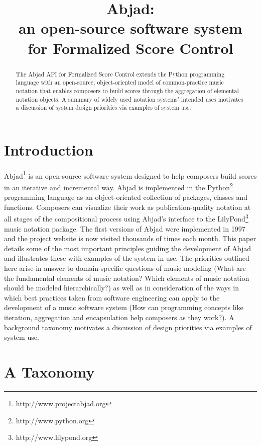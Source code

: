 \documentclass{article}
\title{Abjad: \\
an open-source software system \\
for Formalized Score Control}
\begin{document}
\capstartfalse
\maketitle
\capstarttrue

\begin{abstract}
The Abjad API for Formalized Score Control extends the Python programming
language with an open-source, object-oriented model of common-practice music
notation that enables composers to build scores through the aggregation of
elemental notation objects. A summary of widely used notation systems' intended
uses motivates a discussion of system design priorities via examples of system
use.
\end{abstract}

\section{Introduction} \label{sec:introduction}

Abjad\footnote{http://www.projectabjad.org} is an open-source software system
designed to help composers build scores in an iterative and incremental way.
Abjad is implemented in the Python\footnote{http://www.python.org} programming
language as an object-oriented collection of packages, classes and functions.
Composers can visualize their work as publication-quality notation at all
stages of the compositional process using Abjad's interface to the
LilyPond\footnote{http://www.lilypond.org} music notation package. The first
versions of Abjad were implemented in 1997 and the project website is now
visited thousands of times each month. This paper details some of the most
important principles guiding the development of Abjad and illustrates these
with examples of the system in use. The priorities outlined here arise in
answer to domain-specific questions of music modeling (What are the fundamental
elements of music notation? Which elements of music notation should be modeled
hierarchically?) as well as in consideration of the ways in which best
practices taken from software engineering can apply to the development of a
music software system (How can programming concepts like iteration, aggregation
and encapsulation help composers as they work?). A background taxonomy
motivates a discussion of design priorities via examples of system use.

\section{A Taxonomy} \label{sec:taxonomy}
\end{document}
